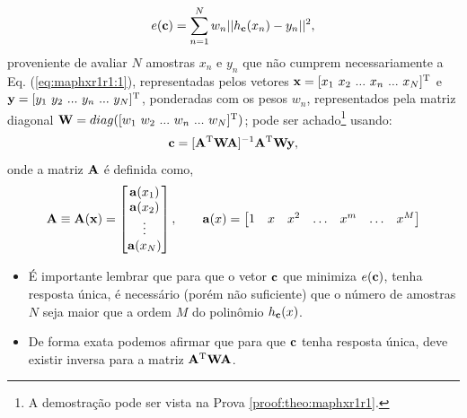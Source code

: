 \begin{theorem}
\begin{equation}\label{eq:maphxr1r1:2}
e(\VECTOR{c}) =  \sum_{n=1}^{N} w_n||h_{\VECTOR{c}}(x_n)-y_n||^2,
\end{equation}
proveniente de avaliar $N$ amostras $x_n$ e $y_n$ que não cumprem necessariamente a Eq. (\ref{eq:maphxr1r1:1}), 
representadas pelos vetores $\VECTOR{x}=[x_1~ x_2~ ...~ x_n~ ...~ x_N]^{\transpose}$ e $\VECTOR{y}=[y_1~ y_2~ ...~ y_n~ ...~ y_N]^{\transpose}$,
ponderadas com os pesos $w_n$, representados pela matriz diagonal $\MATRIX{W}=\funcdiag([w_1~ w_2~ ...~ w_n~ ...~ w_N]^{\transpose})$;
pode ser achado\footnote{A demostração pode ser vista na Prova \ref{proof:theo:maphxr1r1}.} usando:
\begin{equation}\label{eq:maphxr1r1:3}
\VECTOR{c}=[\MATRIX{A}^{\transpose}\MATRIX{W}\MATRIX{A}]^{-1}\MATRIX{A}^{\transpose}\MATRIX{W}\VECTOR{y},
\end{equation}
onde a matriz $\MATRIX{A}$ é definida como,
\begin{equation}\label{eq:maphxr1r1:4}
\MATRIX{A}\equiv \MATRIX{A}(\VECTOR{x})=\begin{bmatrix}
\VECTOR{a}(x_1)\\
\VECTOR{a}(x_2)\\
\vdots\\
\VECTOR{a}(x_N)\\
\end{bmatrix}, \qquad
\VECTOR{a}(x)=\begin{bmatrix}
1& x& x^2& \hdots & x^m& \hdots& x^M
\end{bmatrix}
\end{equation}

\end{theorem}


\begin{tcbattention}
\begin{itemize}
\item É importante lembrar que para que o vetor $\VECTOR{c}$
que minimiza $e(\VECTOR{c})$, tenha resposta única,
é necessário (porém não suficiente) que o número de amostras $N$ seja maior que a ordem $M$ do polinômio $h_{\VECTOR{c}}(x)$.

\item De forma exata podemos afirmar que para que $\VECTOR{c}$ tenha resposta única,
deve existir inversa para a matriz $\MATRIX{A}^{\transpose}\MATRIX{W}\MATRIX{A}$.

\end{itemize}
\end{tcbattention}


